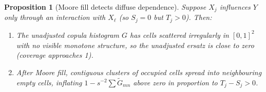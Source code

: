 \documentclass[11pt,a4paper]{article}
\newtheorem{proposition}[theorem]{Proposition}
\theoremstyle{definition}
\begin{document}
\begin{proposition}[Moore fill detects diffuse dependence]
\label{prop:moore-total}
Suppose $X_j$ influences $Y$ only through an interaction with $X_\ell$
(so $S_j = 0$ but $T_j > 0$).  Then:
\begin{enumerate}[label=(\roman*)]
\item The unadjusted copula histogram $G$ has cells scattered irregularly
      in $[0,1]^2$ with no visible monotone structure, so the unadjusted
      ersatz is close to zero (coverage approaches 1).
\item After Moore fill, contiguous clusters of occupied cells spread into
      neighbouring empty cells, inflating $1 - s^{-2}\sum\tilde{G}_{mn}$
      above zero in proportion to $T_j - S_j > 0$.
\end{enumerate}
\end{proposition}
\end{document}
